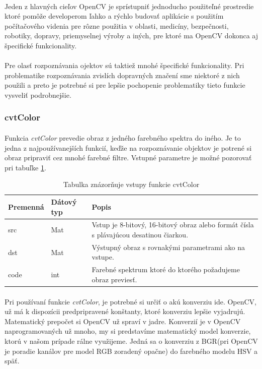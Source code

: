 \documentclass[12pt]{article}
\begin{document}
\paragraph{}
Jeden z hlavných cieľov OpenCV je sprístupniť jednoducho použiteľné prostredie ktoré pomôže developerom ľahko a rýchlo budovať aplikácie s použitím počítačového videnia
pre rôzne použitia v oblasti, medicíny, bezpečnosti, robotiky, dopravy, priemyselnej výroby a iných, pre ktoré ma OpenCV dokonca aj špecifické funkcionality.
\cite{learning_opencv}
\paragraph{}
Pre olasť rozpoznávania ojektov sú taktiež mnohé špecifické funkcionality.
Pri problematike rozpoznávania zvislích dopravných značení sme niektoré z nich použili a preto je potrebné si pre lepšie pochopenie problematiky tieto funkcie vysveliť podrobnejšie.
\subsubsection{cvtColor}
\paragraph{}
Funkcia \emph{cvtColor} prevedie obraz z jedného farebného spektra do iného. Je to jedna z najpoužívanejších funkcií, keďže na rozpoznávanie objektov je potrené si obraz pripraviť
cez mnohé farebné filtre. Vstupné parametre je možné pozorovať pri tabuľke \ref{cvtColorPar}.
\cite{OpenCVDoc}
\begin{table}
	\centering
    \begin{tabular}{ | l | l | p{5cm} |}
    \hline
    Premenná & Dátový typ & Popis \\ \hline
    src & Mat & Vstup je 8-bitový, 16-bitový obraz alebo formát čísla s plávajúcou desatinou čiarkou. \\ \hline
    dst & Mat & Výstupný obraz s rovnakými parametrami ako na vstupe. \\ \hline
    code & int & Farebné spektrum ktoré do ktorého požadujeme obraz previesť. \\
    \hline
    \end{tabular}
  	\caption{Tabulka znázorňuje vstupy funkcie cvtColor}
  	\label{cvtColorPar}
\end{table}
\paragraph{}
Pri používaní funkcie \emph{cvtColor}, je potrebné si určiť o akú konverziu ide. OpenCV, už má k dispozícii predpripravené konštanty, ktoré konverziu lepšie vyjadrujú.
Matematický prepočet si OpenCV už spraví v jadre. Konverzií je v OpenCV naprogramovaných už mnoho, my si predstavíme matematický model konverzie,
ktorú v našom prípade rálne využijeme. Jedná sa o konverziu z BGR(pri OpenCV je poradie kanálov pre model RGB zoradený opačne) do farebného modelu HSV a späť.
\cite{OpenCVDoc}
\end{document}

